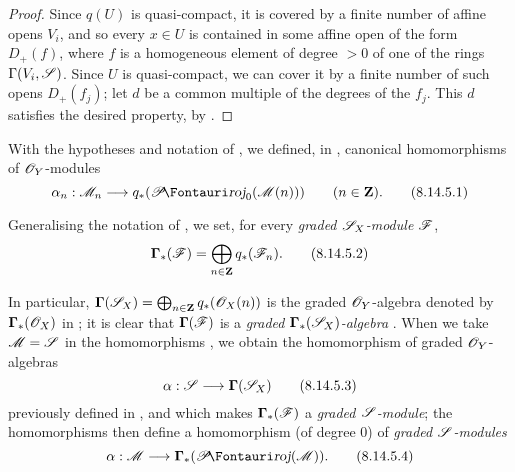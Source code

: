 \begin{proof}
Since $q(U)$ is quasi-compact, it is covered by a finite number of affine opens $V_i$, and so every $x\in U$ is contained in some affine open of the form $D_+(f)$, where $f$ is a homogeneous element of degree $>0$ of one of the rings $\Gamma(V_i,\mathscr{S})$.
Since $U$ is quasi-compact, we can cover it by a finite number of such opens $D_+(f_j)$;
let $d$ be a common multiple of the degrees of the $f_j$.
This $d$ satisfies the desired property, by .
\end{proof}

\begin{env}[8.14.5]
\label{II.8.14.5}
With the hypotheses and notation of , we defined, in , canonical homomorphisms of $\mathscr{O}_Y$-modules
\[
\label{II.8.14.5.1}
    \alpha_n: \sh{M}_n \to q_*(\shProj_0(\sh{M}(n)))
    \qquad (n\in\bb{Z}).
\tag{8.14.5.1}
\]

Generalising the notation of , we set, for every \emph{graded $\mathscr{S}_X$-module $\mathscr{F}$},
\[
\label{II.8.14.5.2}
    \boldsymbol{\Gamma}_*(\mathscr{F}) = \bigoplus_{n\in\mathbf{Z}}q_*(\mathscr{F}_n).
\tag{8.14.5.2}
\]

In particular, $\boldsymbol{\Gamma}(\mathscr{S}_X)=\bigoplus_{n\in\mathbf{Z}}q_*(\mathscr{O}_X(n))$ is the graded $\mathscr{O}_Y$-algebra denoted by $\boldsymbol{\Gamma}_*(\mathscr{O}_X)$ in ;
it is clear that $\boldsymbol{\Gamma}(\mathscr{F})$ is a \emph{graded $\boldsymbol{\Gamma}_*(\mathscr{S}_X)$-algebra} .
When
we take $\mathscr{M}=\mathscr{S}$ in the homomorphisms , we obtain the homomorphism of graded $\mathscr{O}_Y$-algebras
\[
\label{II.8.14.5.3}
    \alpha:\sh{S}\to\boldsymbol{\Gamma}(\sh{S}_X)
\tag{8.14.5.3}
\]
previously defined in , and which makes $\boldsymbol{\Gamma}_*(\mathscr{F})$ a \emph{graded $\mathscr{S}$-module};
the homomorphisms  then define a homomorphism (of degree $0$) of \emph{graded $\mathscr{S}$-modules}
\[
\label{II.8.14.5.4}
    \alpha:\sh{M}\to\boldsymbol{\Gamma}_*(\shProj(\sh{M})).
\tag{8.14.5.4}
\]
\end{env}

